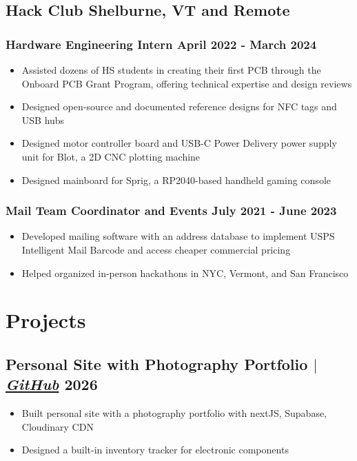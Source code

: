 \documentclass[11pt]{article}
\begin{document}
\subsection{Hack Club \hfill Shelburne, VT and Remote}
\subsubsection{Hardware Engineering Intern \hfill April 2022 - March 2024}
\begin{itemize}
    \item Assisted dozens of HS students in creating their first PCB through the Onboard PCB Grant Program, offering technical expertise and design reviews
    \item Designed open-source and documented reference designs for NFC tags and USB hubs
    \item Designed motor controller board and USB-C Power Delivery power supply unit for Blot, a 2D CNC plotting machine
    \item Designed mainboard for Sprig, a RP2040-based handheld gaming console
\end{itemize}
\subsubsection{Mail Team Coordinator and Events \hfill July 2021 - June 2023}
\begin{itemize}
    \item Developed mailing software with an address database to implement USPS Intelligent Mail Barcode and access cheaper commercial pricing 
    \item Helped organized in-person hackathons in NYC, Vermont, and San Francisco
\end{itemize}

\section{Projects}
\subsection{Personal Site with Photography Portfolio {\normalfont $|$ \href{https://github.com/Hugoyhu/hugohu.me}{\textit{GitHub}}} \hfill 2026}
\begin{itemize}
    \item Built personal site with a photography portfolio with nextJS, Supabase, Cloudinary CDN
    \item Designed a built-in inventory tracker for electronic components
\end{itemize}
\end{document}
